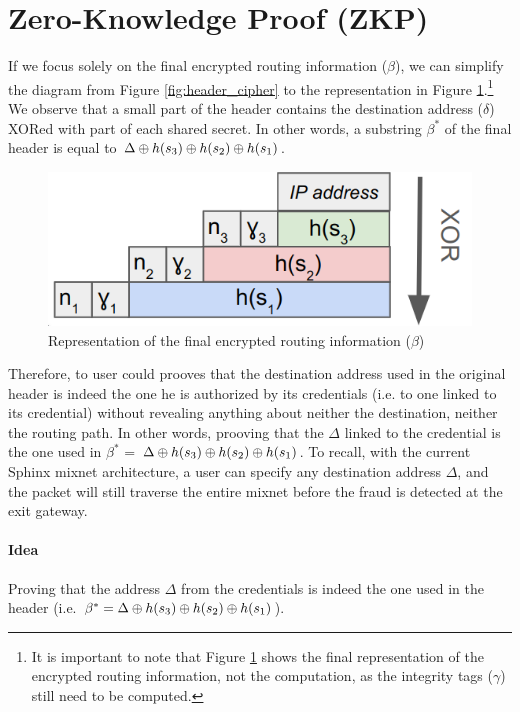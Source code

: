 \section{Zero-Knowledge Proof (ZKP)}

If we focus solely on the final encrypted routing information ($\beta$), we can simplify the diagram from Figure \ref{fig:header_cipher} to the representation in Figure \ref{fig:schema_final_header}.\footnote{It is important to note that Figure \ref{fig:schema_final_header} shows the final representation of the encrypted routing information, not the computation, as the integrity tags ($\gamma$) still need to be computed.}
We observe that a small part of the header contains the destination address ($\delta$) XORed with part of each shared secret. In other words, a substring $\beta^*$ of the final header is equal to $\Delta \oplus h(s_3) \oplus h(s_2) \oplus h(s_1)$.

\begin{figure}[H]
    \centering
    \includegraphics[width=0.5\linewidth]{Images/structure_final_header.png}
    \caption{Representation of the final encrypted routing information ($\beta$)}
    \label{fig:schema_final_header}
\end{figure}

Therefore, to user could prooves that the destination address used in the original header is indeed the one he is authorized by its credentials (i.e. to one linked to its credential) without revealing anything about neither the destination, neither the routing path. In other words, prooving that the $\Delta$ linked to the credential is the one used in $\beta^*$ = $\Delta \oplus h(s_3) \oplus h(s_2) \oplus h(s_1)$.
To recall, with the current Sphinx mixnet architecture, a user can specify any destination address $\Delta$, and the packet will still traverse the entire mixnet before the fraud is detected at the exit gateway.

\paragraph{Idea} Proving that the address $\Delta$ from the credentials is indeed the one used in the header (i.e. $\beta^* = \Delta \oplus h(s_3) \oplus h(s_2) \oplus h(s_1)$).


